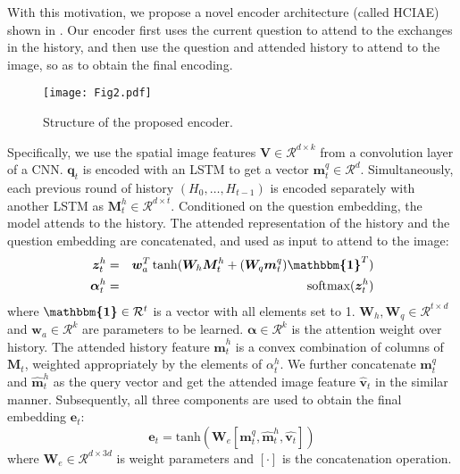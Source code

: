 \documentclass{article}
\newcommand{\ourenc}{HCIAE\xspace}
\begin{document}
With this motivation, we propose a novel encoder architecture (called \ourenc) shown in . 
Our encoder first uses the current question to attend to the exchanges in the history, 
and then use the question and attended history to attend to the image, so as to obtain the final encoding.  

\begin{wrapfigure}{r}{0.45\textwidth}
\vspace{-5mm}
  \begin{center}
    \texttt{[image: Fig2.pdf]}
  \end{center}
\caption{Structure of the proposed encoder. }\label{fig:encoder_model}  
 \vspace{-5mm}
\end{wrapfigure}


Specifically, we use the spatial image features $\bm{V} \in \mathcal{R}^{d \times k}$ from a convolution layer of a CNN. 
$\bm{q}_t$ is encoded with an LSTM to get a vector $\bm{m}^q_t \in \mathcal{R}^d$. Simultaneously, each previous round of history $({H}_0,\ldots, {H}_{t-1})$ is encoded separately with another LSTM as $\bm{M}^h_t \in \mathcal{R}^{d \times t} $. Conditioned on the question embedding, the model attends to the history. The attended representation of the history and the question embedding are concatenated, and used as input to attend to the image: 
\begin{eqnarray}
\bm{z}^h_t &=& \bm{w}_{a}^T \tanh(\bm{W}_h \bm{M}^h_t + (\bm{W}_{q} \bm{m}^q_t)
\bm{\mathbbm{1}}^T ) 
\label{eq:4}
\\ 
\bm{\alpha}^h_t &=& \textrm{softmax}(\bm{z}^h_t) 
\label{eq:5}
\end{eqnarray}
where $\bm{\mathbbm{1}} \in \mathcal{R}^t$ is a vector with all elements set to 1. $\bm{W}_h,
\bm{W}_q \in \mathcal{R}^{t \times d}$ and $\bm{w}_{a} \in \mathcal{R}^k$ are parameters to be
learned. $\bm{\alpha} \in \mathcal{R}^k$ is the attention weight over history.  The attended history feature $\hat{\bm{m}}^h_t$ is a convex combination of columns of $\bm{M}_t$, weighted appropriately by the elements of $\alpha^h_t$.
We further concatenate $\bm{m}^q_t$ and $\hat{\bm{m}}^h_t$ as the query 
vector and get the attended image feature $\hat{\bm{v}}_t$ in the similar manner. 
Subsequently,  all three components are used to obtain the final embedding $\bm{e}_t$:
\begin{equation}
\bm{e}_t = \textrm{tanh}(\bm{W}_e[\bm{m}^q_t, \hat{\bm{m}}^h_t, \hat{\bm{v}_t}])
\end{equation}
where $\bm{W}_e \in \mathcal{R}^{d \times 3d}$ is weight parameters and $[\cdot]$ is the concatenation operation.  
\end{document}

